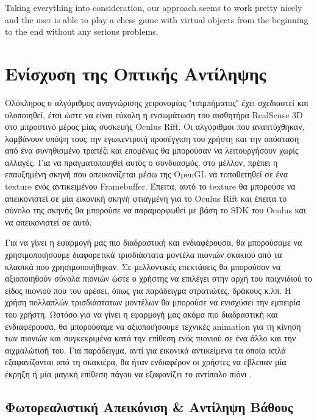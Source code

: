  Taking everything into consideration, our approach seems to work pretty nicely and the user is able to play a chess game with virtual objects from the beginning to the end without any serious problems.

\section{Ενίσχυση της Οπτικής Αντίληψης}
Ολόκληρος ο αλγόριθμος αναγνώρισης χειρονομίας "τσιμπήματος" έχει σχεδιαστεί και υλοποιηθεί, έτσι ώστε να είναι εύκολη η ενσωμάτωση του αισθητήρα RealSense 3D στο μπροστινό μέρος μίας συσκευής Oculus Rift. Οι αλγόριθμοι που αναπτύχθηκαν, λαμβάνουν υπόψη τους την εγωκεντρική προσέγγιση του χρήστη και την απόσταση από ένα συνηθισμένο τραπέζι και επομένως θα μπορούσαν να λειτουργήσουν χωρίς αλλαγές. Για να πραγματοποιηθεί αυτός ο συνδυασμός, στο μέλλον, πρέπει η επαυξημένη σκηνή που απεικονίζεται μέσω της OpenGL να τοποθετηθεί σε ένα texture ενός αντικειμένου Framebuffer. Έπειτα, αυτό το texture θα μπορούσε να απεικονιστεί σε μία εικονική σκηνή φτιαγμένη για το Oculus Rift και έπειτα το σύνολο της σκηνής θα μπορούσε να παραμορφωθεί με βάση το SDK του Oculus και να απεικονιστεί σε αυτό. 


Για να γίνει η εφαρμογή μας πιο διαδραστική και ενδιαφέρουσα, θα μπορούσαμε να χρησιμοποιήσουμε διαφορετικά τρισδιάστατα μοντέλα πιονιών σκακιού από τα κλασικά που χρησιμοποιήθηκαν. Σε μελλοντικές επεκτάσεις θα μπορούσαν να αξιοποιηθούν σύνολα πιονιών ώστε ο χρήστης να επιλέγει στην αρχή του παιχνιδιού το είδος πιονιού που του αρέσει, όπως για παράδειγμα στρατιώτες, δράκους κ.λπ.
Η χρήση πολλαπλών τρισδιάστατων μοντέλων θα μπορούσε να ενισχύσει την εμπειρία του χρήστη. Ωστόσο για να γίνει η εφαρμογή μας ακόμα πιο διαδραστική και ενδιαφέρουσα, θα μπορούσαμε να αξιοποιήσουμε τεχνικές animation για τη κίνηση των πιονιών και συγκεκριμένα κατά την επίθεση ενός πιονιού σε ένα άλλο και την αιχμαλώτισή του. Για παράδειγμα, αντί για εικονικά αντικείμενα τα οποία απλά εξαφανίζονται από τη σκακιέρα, θα ήταν ενδιαφέρον οι χρήστες να έβλεπαν μία έκρηξη ή μία μαγική επίθεση πάγου να εξαφανίζει το αντίπαλο πιόνι \cite{harrypotter}.





\subsection{Φωτορεαλιστική Απεικόνιση \& Αντίληψη Βάθους}



